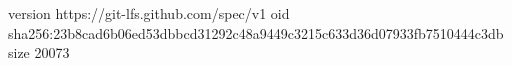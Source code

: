 version https://git-lfs.github.com/spec/v1
oid sha256:23b8cad6b06ed53dbbcd31292c48a9449c3215c633d36d07933fb7510444c3db
size 20073
